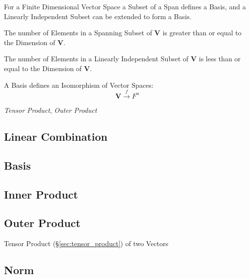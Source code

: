 For a Finite Dimensional Vector Space a Subset of a Span defines a
Basis, and a Linearly Independent Subset can be extended to form a
Basis.

The number of Elements in a Spanning Subset of $\mathbf{V}$ is greater
than or equal to the Dimension of $\mathbf{V}$.

The number of Elements in a Linearly Independent Subset of
$\mathbf{V}$ is less than or equal to the Dimension of $\mathbf{V}$.

A Basis defines an Isomorphism of Vector Spaces:
\[
    \mathbf{V} \xrightarrow{f} F^n
\]

\emph{Tensor Product}, \emph{Outer Product}



\subsection{Linear Combination}\label{sec:linear_combination}

\subsection{Basis}\label{sec:basis}

\subsection{Inner Product}\label{sec:inner_product}

\subsection{Outer Product}\label{sec:outer_product}

Tensor Product (\S\ref{sec:tensor_product}) of two Vectors



\subsection{Norm}\label{sec:vector_space_norm}

